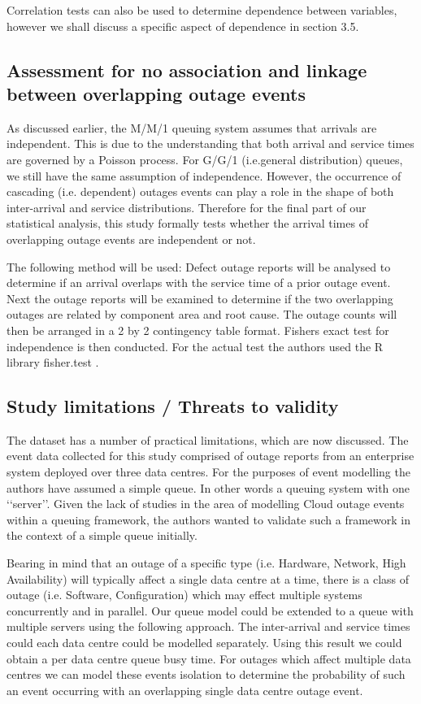\documentclass[5p]{elsarticle}
\begin{document}
Correlation tests can also be used to determine dependence between variables, however we shall discuss a specific aspect of dependence in section 3.5. 


\subsection{Assessment for no association and linkage between overlapping outage events}

As discussed earlier, the M/M/1 queuing system assumes that arrivals are independent. This is due to the understanding that both arrival and service times are governed by a Poisson process. For G/G/1 (i.e.general distribution) queues, we still have the same assumption of independence. However, the occurrence of cascading (i.e. dependent) outages events can play a role in the shape of both inter-arrival and service distributions. Therefore for the final part of our statistical analysis, this study formally tests whether the arrival times of overlapping outage events are independent or not. 

The following method will be used: Defect outage reports will be analysed to determine if an arrival overlaps with the service time of a prior outage event. Next the outage reports will be examined to determine if the two overlapping outages are related by component area and root cause. The outage counts will then be arranged in a 2 by 2 contingency table format. Fishers exact test for independence\cite{fisher1922interpretation}\cite{fisher1925statistical} is then conducted. For the actual test the authors used the R library fisher.test \cite{FisherExact}. 

\subsection{Study limitations / Threats to validity}

The dataset has a number of practical limitations, which are now discussed. The event data collected for this study comprised of outage reports from an enterprise system deployed over three data centres. For the purposes of event modelling the authors have assumed a simple queue. In other words a queuing system with one \lq\lq server\rq\rq. Given the lack of studies in the area of modelling Cloud outage events within a queuing framework, the authors wanted to validate such a framework in the context of a simple queue initially. 

Bearing in mind that an outage of a specific type (i.e. Hardware, Network, High Availability) will typically affect a single data centre at a time, there is a class of outage (i.e. Software, Configuration) which may effect multiple systems concurrently and in parallel. Our queue model could be extended to a queue with multiple servers using the following approach. The inter-arrival and service times could each data centre could be modelled separately. Using this result we could obtain a per data centre queue busy time. For outages which affect multiple data centres we can model these events isolation to determine the probability of such an event occurring with an overlapping single data centre outage event.
\end{document}
